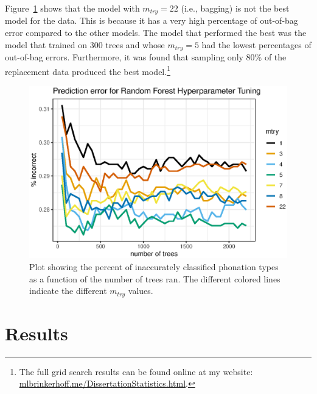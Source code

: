 Figure~\ref{fig:mtry_number} shows that the model with $m_{try} = 22$ (i.e., bagging) is not the best model for the data. This is because it has a very high percentage of out-of-bag error compared to the other models. The model that performed the best was the model that trained on 300 trees and whose $m_{try} = 5$ had the lowest percentages of out-of-bag errors. Furthermore, it was found that sampling only 80\% of the replacement data produced the best model.\footnote{The full grid search results can be found online at my website: \href{https://www.mlbrinkerhoff.me/DissertationStatistics.html}{mlbrinkerhoff.me/DissertationStatistics.html}.}

\begin{figure}[h!]
    \centering
    \includegraphics[width = 0.9\linewidth]{images/RandomForest/tree_num_dur.eps}
    \caption{Plot showing the percent of inaccurately classified phonation types as a function of the number of trees ran. The different colored lines indicate the different $m_{try}$ values.}
    \label{fig:mtry_number}
\end{figure}

\section{Results} \label{sec:dt_results}

